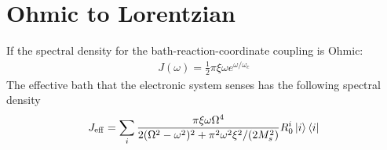 \documentclass{article}
\begin{document}
\section*{Ohmic to Lorentzian}
If the spectral density for the bath-reaction-coordinate coupling is Ohmic:
\begin{align*}
	J(\omega)=\frac{1}{2}\pi\xi\omega e^{\omega/\omega_c}
\end{align*}
The effective bath that the electronic system senses has  the following spectral density 
\begin{align}
	J_\mathrm{eff} = \sum_i \frac{\pi\xi\omega\Omega^4}{2(\Omega^2-\omega^2)^2 + \pi^2\omega^2\xi^2/(2M_s^2)} R_0^i\ket{i}\bra{i}
\end{align}
\end{document}
